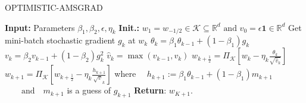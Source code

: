 \documentclass[11pt]{article}
\theoremstyle{k}
\begin{document}
%

\begin{algorithm}[H]
\caption{OPTIMISTIC-AMSGRAD}\label{alg:optamsgrad}
  \begin{algorithmic}[1]
  \STATE \textbf{Input:} Parameters $\beta_{1}, \beta_{2}, \epsilon, \eta_{k}$
  \STATE \textbf{Init.:} $w_{1}=w_{-1 / 2} \in \mathcal{K} \subseteq \mathbb{R}^{d} \text { and } v_{0}=\epsilon \mathbf{1} \in \mathbb{R}^{d}$
  \STATE Get mini-batch stochastic gradient $g_{k}$ at $w_{k}$
   \STATE $\theta_{k}=\beta_{1} \theta_{k-1}+\left(1-\beta_{1}\right) g_{k}$
   \STATE $v_{k}=\beta_{2} v_{k-1}+\left(1-\beta_{2}\right) g_{k}^{2}$
   \STATE $ \hat{v}_{k}=\max \left(\hat{v}_{k-1}, v_{k}\right)$
   \STATE $ w_{k+\frac{1}{2}}=\Pi_{\mathcal{K}}\left[w_k-\eta_{k} \frac{\theta_{k}}{\sqrt{\hat{v}_{k}}}\right]$
   \STATE $ w_{k+1}=\Pi_{\mathcal{K}}\left[w_{k+\frac{1}{2}}-\eta_{k} \frac{h_{k+1}}{\sqrt{v}_{k}}\right]$
where $ \quad h_{k+1}:=\beta_{1} \theta_{k-1} + (1-\beta_{1}) m_{k+1}$
      \STATE $ \quad\quad \text{and} \quad m_{k+1}$ is a guess of $g_{k+1}$
\ENDFOR
\STATE \textbf{Return}: $w_{K+1}$.
  \end{algorithmic}
\end{algorithm}\vspace{.1cm}
\end{document}
